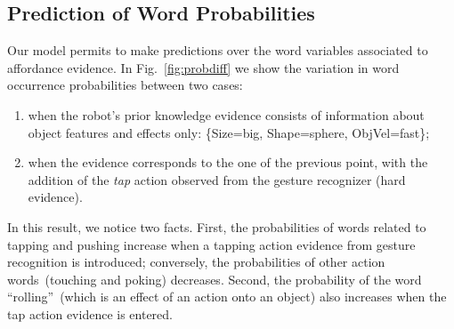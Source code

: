 \subsection{Prediction of Word Probabilities}
\label{sec:results:prediction_words}

Our model permits to make predictions over the word variables associated to affordance evidence.
In Fig.~\ref{fig:probdiff} we show the variation in word occurrence probabilities between two cases:
\begin{enumerate}
\item when the robot's prior knowledge evidence consists of information about object features and effects only: \{Size=big, Shape=sphere, ObjVel=fast\};

\item when the evidence corresponds to the one of the previous point, with the addition of the \emph{tap} action observed from the gesture recognizer (hard evidence).
\end{enumerate}

In this result, we notice two facts.
First, the probabilities of words related to tapping and pushing increase when a tapping action evidence from gesture recognition is introduced; conversely, the probabilities of other action words~(touching and poking) decreases.
Second, the probability of the word ``rolling''~(which is an effect of an action onto an object) also increases when the tap action evidence is entered.

\newcommand{\evidenceProducingAnd}{$\xobs=$\{ Action=grasp, ObjVel=medium \}}
\newcommand{\evidenceProducingBut}{$\xobs=$\{ Action=grasp, ObjVel=slow \}}

